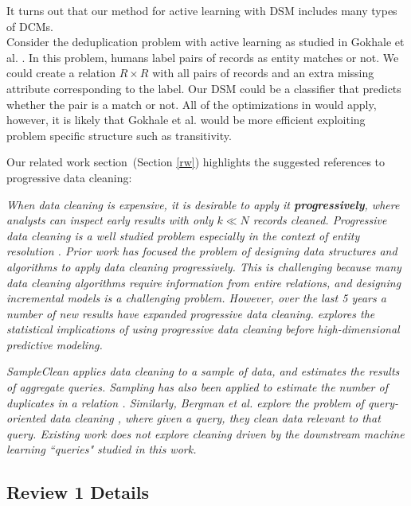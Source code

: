 {It turns out that our method for active learning with DSM includes many types of DCMs.\\
Consider the deduplication problem with active learning as studied in Gokhale et al. \cite{gokhale2014corleone}.
In this problem, humans label pairs of records as entity matches or not.
We could create a relation $R \times R$ with all pairs of records and an extra missing attribute corresponding to the label. 
Our DSM could be a classifier that predicts whether the pair is a match or not.
All of the optimizations in \sys would apply, however, it is likely that Gokhale et al. would be more efficient exploiting problem specific structure such as transitivity.}

\vspace{0.5em}
Our related work section~(Section \ref{rw}) highlights the suggested references to progressive data cleaning:

\emph{When data cleaning is expensive, it is desirable to apply it \textbf{progressively}, where analysts can inspect early results with only $k \ll N$ records cleaned.
Progressive data cleaning is a well studied problem especially in the context of entity resolution \cite{altowim2014progressive, whang2014incremental, papenbrock2015progressive, gruenheid2014incremental}.
Prior work has focused the problem of designing data structures and algorithms to apply data cleaning progressively.
This is challenging because many data cleaning algorithms require information from entire relations, and designing incremental models is a challenging problem.
However, over the last 5 years a number of new results have expanded progressive data cleaning\cite{mayfield2010eracer, DBLP:journals/pvldb/YakoutENOI11, yakout2013don}.
\sys explores the statistical implications of using progressive data cleaning before high-dimensional predictive modeling.}

\vspace{0.5em}

\emph{SampleClean\cite{wang1999sample} applies data cleaning to a sample of data, and estimates the results of aggregate queries.
Sampling has also been applied to estimate the number of duplicates in a relation \cite{heise2014estimating}. 
Similarly, Bergman et al. explore the problem of query-oriented data cleaning \cite{DBLP:conf/sigmod/BergmanMNT15}, where given a query, they clean data relevant to that query. 
Existing work does not explore cleaning driven by the downstream machine learning ``queries" studied in this work.}

\subsection*{Review 1 Details} 

